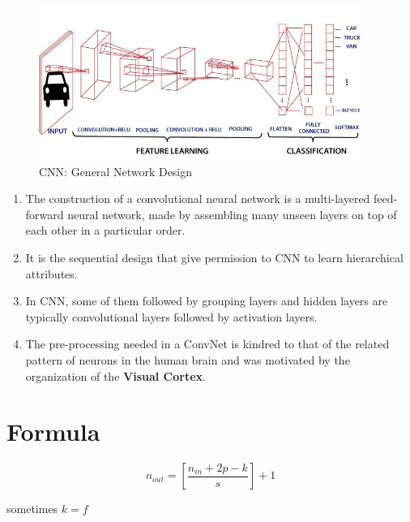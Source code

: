 \begin{figure}[h]
    \centering
    \includegraphics[width=\linewidth, height=5cm, keepaspectratio]{Pictures/convolutional-neural-network/convolutional-neural-network.jpg}
    \caption{CNN: General Network Design}
\end{figure}

\begin{enumerate}
    \item The construction of a convolutional neural network is a multi-layered feed-forward neural network, made by assembling many unseen layers on top of each other in a particular order.

    \item It is the sequential design that give permission to CNN to learn hierarchical attributes.
    
    \item In CNN, some of them followed by grouping layers and hidden layers are typically convolutional layers followed by activation layers.
    
    \item The pre-processing needed in a ConvNet is kindred to that of the related pattern of neurons in the human brain and was motivated by the organization of the \textbf{Visual Cortex}.
\end{enumerate}


\section{Formula}
\[
   \displaystyle n_{out} = \left[ \dfrac{n_{in} + 2p - k}{s} \right] + 1
\]

sometimes $k=f$

